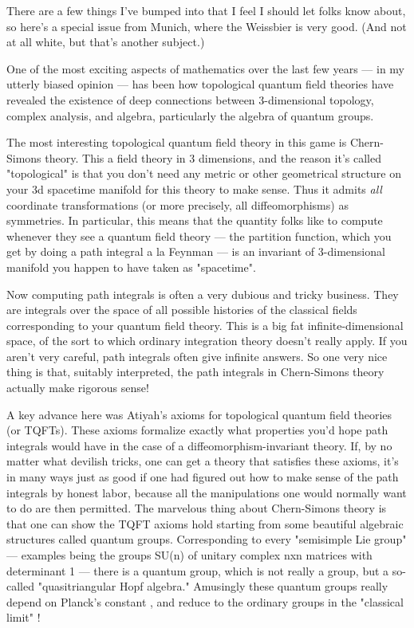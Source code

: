 
 
There are a few things I've bumped into that I feel I should let folks know 
about, so here's a special issue from Munich, where the Weissbier
is very good.  (And not at all white, but that's another subject.) 

One of the most exciting aspects of mathematics over the last few
years --- in my utterly biased opinion --- has been how topological
quantum field theories have revealed the existence of deep connections
between 3-dimensional topology, complex analysis, and algebra, particularly
the algebra of quantum groups.

The most interesting topological quantum field theory in this game is
Chern-Simons theory.  This a field theory in 3 dimensions, and the
reason it's called "topological" is that you don't need any metric
or other geometrical structure on your 3d spacetime manifold for this 
theory to make sense.  Thus it admits \emph{all} coordinate transformations 
(or more precisely, all diffeomorphisms) as symmetries.  In particular, this
means that the quantity folks like to compute whenever they see a
quantum field theory --- the partition function, which you get by
doing a path integral a la Feynman --- is an invariant of 
3-dimensional manifold you happen to have taken as "spacetime".  

Now computing path integrals is often a very dubious and tricky
business.  They are integrals over the space of all possible histories
of the classical fields corresponding to your quantum field theory.
This is a big fat infinite-dimensional space, of the sort to which ordinary
integration theory doesn't really apply.  If you aren't very careful,
path integrals often give infinite answers.  So one very nice thing is
that, suitably interpreted, the path integrals in Chern-Simons theory
actually make rigorous sense!

A key advance here was Atiyah's axioms for topological quantum field
theories (or TQFTs).  These axioms formalize exactly what properties
you'd hope path integrals would have in the case of a
diffeomorphism-invariant theory.  If, by no matter what devilish
tricks, one can get a theory that satisfies these axioms, it's in many
ways just as good if one had figured out how to make sense of the path
integrals by honest labor, because all the manipulations one would normally
want to do are then permitted.  The marvelous thing about Chern-Simons
theory is that one can show the TQFT axioms hold starting from some 
beautiful algebraic structures called quantum groups.  Corresponding to
every "semisimple Lie group" --- examples being the groups SU(n) of
unitary complex nxn matrices with determinant 1 --- there is a quantum
group, which is not really a group, but a so-called "quasitriangular Hopf 
algebra."  Amusingly these quantum groups really depend on Planck's constant 
\hbar , and reduce to the ordinary groups in the "classical limit" \hbar  {}!

